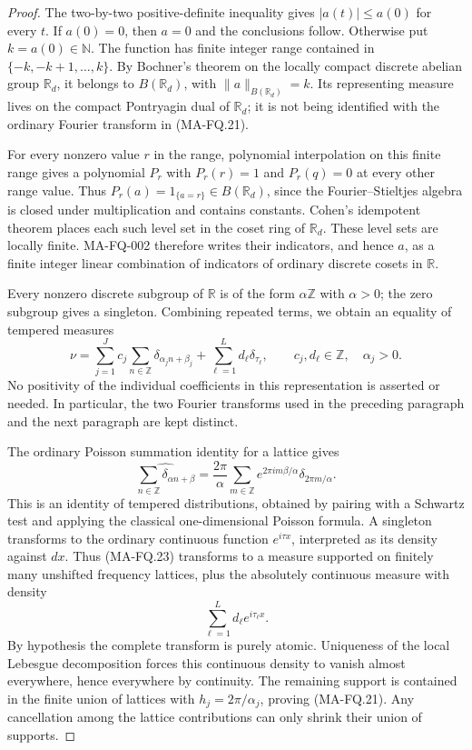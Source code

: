 \begin{proof}
The two-by-two positive-definite inequality gives
$|a(t)|\le a(0)$ for every $t$.  If $a(0)=0$, then $a=0$
and the conclusions follow.  Otherwise put $k=a(0)\in\mathbb N$.
The function has finite integer range contained in
$\{-k,-k+1,\ldots,k\}$.
By Bochner's theorem on the locally compact discrete abelian
group $\mathbb R_d$, it belongs to $B(\mathbb R_d)$, with
$\|a\|_{B(\mathbb R_d)}=k$.  Its representing measure lives on
the compact Pontryagin dual of $\mathbb R_d$; it is not being
identified with the ordinary Fourier transform in (MA-FQ.21).

For every nonzero value $r$ in the range, polynomial
interpolation on this finite range gives a polynomial $P_r$
with $P_r(r)=1$ and $P_r(q)=0$ at every other range value.
Thus $P_r(a)=1_{\{a=r\}}\in B(\mathbb R_d)$, since the
Fourier--Stieltjes algebra is closed under multiplication
and contains constants.  Cohen's idempotent theorem places
each such level set in the coset ring of $\mathbb R_d$.
These level sets are locally finite.  MA-FQ-002 therefore
writes their indicators, and hence $a$, as a finite integer
linear combination of indicators of ordinary discrete
cosets in $\mathbb R$.

Every nonzero discrete subgroup of $\mathbb R$ is of the
form $\alpha\mathbb Z$ with $\alpha>0$; the zero subgroup
gives a singleton.  Combining repeated terms, we obtain
an equality of tempered measures
\[
 \nu=\sum_{j=1}^{J}c_j\sum_{n\in\mathbb Z}
                         \delta_{\alpha_j n+\beta_j}
                  +\sum_{\ell=1}^{L}d_\ell\delta_{\tau_\ell},
 \qquad c_j,d_\ell\in\mathbb Z,\quad \alpha_j>0 .
\tag{MA-FQ.23}
\]
No positivity of the individual coefficients in this
representation is asserted or needed.  In particular,
the two Fourier transforms used in the preceding paragraph
and the next paragraph are kept distinct.

The ordinary Poisson summation identity for a lattice gives
\[
 \widehat{\sum_{n\in\mathbb Z}\delta_{\alpha n+\beta}}
    =\frac{2\pi}{\alpha}\sum_{m\in\mathbb Z}
        e^{2\pi i m\beta/\alpha}\delta_{2\pi m/\alpha}.
\tag{MA-FQ.24}
\]
This is an identity of tempered distributions, obtained by
pairing with a Schwartz test and applying the classical
one-dimensional Poisson formula.  A singleton transforms
to the ordinary continuous function $e^{i\tau x}$, interpreted
as its density against $dx$.  Thus (MA-FQ.23) transforms to
a measure supported on finitely many unshifted frequency
lattices, plus the absolutely continuous measure with density
\[
                         \sum_{\ell=1}^{L}d_\ell e^{i\tau_\ell x}.
\]
By hypothesis the complete transform is purely atomic.
Uniqueness of the local Lebesgue decomposition forces this
continuous density to vanish almost everywhere, hence
everywhere by continuity.  The remaining support is
contained in the finite union of lattices with
$h_j=2\pi/\alpha_j$, proving (MA-FQ.21).
Any cancellation among the lattice contributions can only
shrink their union of supports.


\end{proof}
